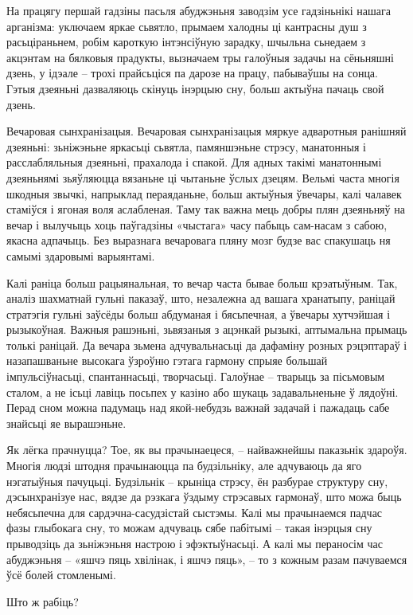 На працягу першай гадзіны пасьля абуджэньня заводзім усе гадзіньнікі нашага арганізма: уключаем яркае сьвятло, прымаем халодны ці кантрасны душ з расьціраньнем, робім кароткую інтэнсіўную зарадку, шчыльна сьнедаем з акцэнтам на бялковыя прадукты, вызначаем тры галоўныя задачы на сёньняшні дзень, у ідэале – трохі прайсьціся па дарозе на працу, пабываўшы на сонца. Гэтыя дзеяньні дазваляюць скінуць інэрцыю сну, больш актыўна пачаць свой дзень.

Вечаровая сынхранізацыя. Вечаровая сынхранізацыя мяркуе адваротныя ранішняй дзеяньні: зьніжэньне яркасьці сьвятла, памяншэньне стрэсу, манатонныя і расслабляльныя дзеяньні, прахалода і спакой. Для адных такімі манатоннымі дзеяньнямі зьяўляюцца вязаньне ці чытаньне ўслых дзецям. Вельмі часта многія шкодныя звычкі, напрыклад пераяданьне, больш актыўныя ўвечары, калі чалавек стаміўся і ягоная воля аслабленая. Таму так важна мець добры плян дзеяньняў на вечар і вылучыць хоць паўгадзіны «чыстага» часу пабыць сам-насам з сабою, якасна адпачыць. Без выразнага вечаровага пляну мозг будзе вас спакушаць ня самымі здаровымі варыянтамі.

Калі раніца больш рацыянальная, то вечар часта бывае больш крэатыўным. Так, аналіз шахматнай гульні паказаў, што, незалежна ад вашага хранатыпу, раніцай стратэгія гульні заўсёды больш абдуманая і бясьпечная, а ўвечары хутчэйшая і рызыкоўная. Важныя рашэньні, зьвязаныя з ацэнкай рызыкі, аптымальна прымаць толькі раніцай. Да вечара зьмена адчувальнасьці да дафаміну розных рэцэптараў і назапашваньне высокага ўзроўню гэтага гармону спрыяе большай імпульсіўнасьці, спантаннасьці, творчасьці. Галоўнае – тварыць за пісьмовым сталом, а не ісьці лавіць посьпех у казіно або шукаць задавальненьне ў лядоўні. Перад сном можна падумаць над якой-небудзь важнай задачай і пажадаць сабе знайсьці яе вырашэньне.

Як лёгка прачнуцца? Тое, як вы прачынаецеся, – найважнейшы паказьнік здароўя. Многія людзі штодня прачынаюцца па будзільніку, але адчуваюць да яго нэгатыўныя пачуцьці. Будзільнік – крыніца стрэсу, ён разбурае структуру сну, дэсынхранізуе нас, вядзе да рэзкага ўздыму стрэсавых гармонаў, што можа быць небясьпечна для сардэчна-сасудзістай сыстэмы. Калі мы прачынаемся падчас фазы глыбокага сну, то можам адчуваць сябе пабітымі – такая інэрцыя сну прыводзіць да зьніжэньня настрою і эфэктыўнасьці. А калі мы пераносім час абуджэньня – «яшчэ пяць хвілінак, і яшчэ пяць», – то з кожным разам пачуваемся ўсё болей стомленымі.

Што ж рабіць? 


